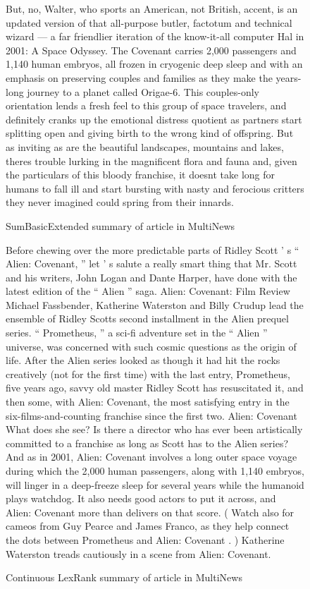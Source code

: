 \documentclass[../writeup.tex]{subfiles}
\begin{document}
\begin{figure}[h]
{        But, no, Walter, who sports an American, not British, accent, is an updated version of that all-purpose butler, factotum and technical wizard — a far friendlier iteration of the know-it-all computer Hal in 2001: A Space Odyssey.
        The Covenant carries 2,000 passengers and 1,140 human embryos, all frozen in cryogenic deep sleep and with an emphasis on preserving couples and families as they make the years-long journey to a planet called Origae-6.
        This couples-only orientation lends a fresh feel to this group of space travelers, and definitely cranks up the emotional distress quotient as partners start splitting open and giving birth to the wrong kind of offspring.
        But as inviting as are the beautiful landscapes, mountains and lakes, theres trouble lurking in the magnificent flora and fauna and, given the particulars of this bloody franchise, it doesnt take long for humans to fall ill and start bursting with nasty and ferocious critters they never imagined could spring from their innards. }

    \caption{SumBasicExtended summary of article in MultiNews}
    \label{appendix:fig:summaries:sumbasic_multi}
\end{figure}


\begin{figure}[h]
    \centering
    {\small Before chewing over the more predictable parts of Ridley Scott ’ s “ Alien: Covenant, ” let ’ s salute a really smart thing that Mr. Scott and his writers, John Logan and Dante Harper, have done with the latest edition of the “ Alien ” saga. Alien: Covenant: Film Review Michael Fassbender, Katherine Waterston and Billy Crudup lead the ensemble of Ridley Scotts second installment in the Alien prequel series. “ Prometheus, ” a sci-fi adventure set in the “ Alien ” universe, was concerned with such cosmic questions as the origin of life. After the Alien series looked as though it had hit the rocks creatively (not for the first time) with the last entry, Prometheus, five years ago, savvy old master Ridley Scott has resuscitated it, and then some, with Alien: Covenant, the most satisfying entry in the six-films-and-counting franchise since the first two. Alien: Covenant What does she see? Is there a director who has ever been artistically committed to a franchise as long as Scott has to the Alien series? And as in 2001, Alien: Covenant involves a long outer space voyage during which the 2,000 human passengers, along with 1,140 embryos, will linger in a deep-freeze sleep for several years while the humanoid plays watchdog. It also needs good actors to put it across, and Alien: Covenant more than delivers on that score. ( Watch also for cameos from Guy Pearce and James Franco, as they help connect the dots between Prometheus and Alien: Covenant . ) Katherine Waterston treads cautiously in a scene from Alien: Covenant.}
    \caption{Continuous LexRank summary of article in MultiNews}
    \label{appendix:fig:summaries:lexrank_multi}
\end{figure}
\end{document}
